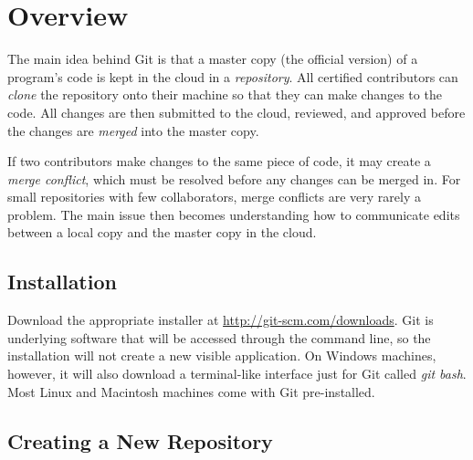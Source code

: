 \label{appendix:git}

\section*{Overview} %

The main idea behind Git is that a master copy (the official version) of a program's code is kept in the cloud in a \emph{repository}.
All certified contributors can \emph{clone} the repository onto their machine so that they can make changes to the code.
All changes are then submitted to the cloud, reviewed, and approved before the changes are \emph{merged} into the master copy.

If two contributors make changes to the same piece of code, it may create a \emph{merge conflict}, which must be resolved before any changes can be merged in.
For small repositories with few collaborators, merge conflicts are very rarely a problem.
The main issue then becomes understanding how to communicate edits between a local copy and the master copy in the cloud.

\subsection*{Installation} %

Download the appropriate installer at \url{http://git-scm.com/downloads}.
Git is underlying software that will be accessed through the command line, so the installation will not create a new visible application.
On Windows machines, however, it will also download a terminal-like interface just for Git called \emph{git bash}.
Most Linux and Macintosh machines come with Git pre-installed.

\subsection*{Creating a New Repository} %


